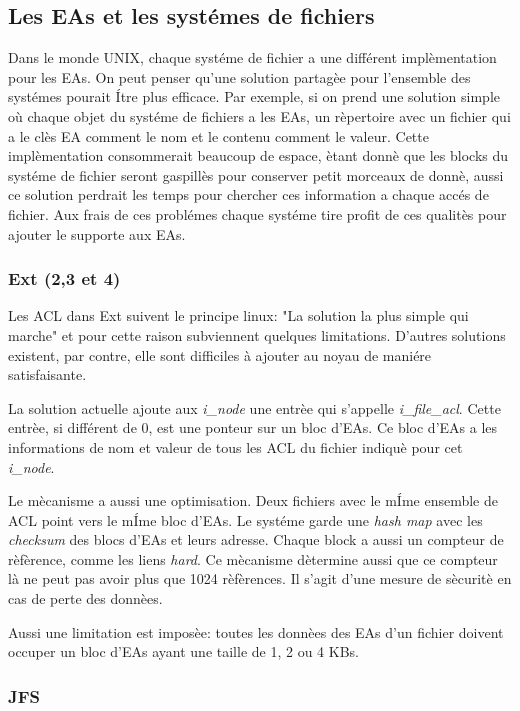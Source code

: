 \subsection{Les EAs et les systémes de fichiers}
 
Dans le monde UNIX, chaque systéme de fichier a une différent implèmentation pour les EAs. On peut penser qu'une solution partagèe pour l'ensemble des systémes pourait Ítre plus efficace. Par exemple, si on prend une solution simple où chaque objet du systéme de fichiers a les EAs, un rèpertoire avec un fichier qui a le clès EA comment le nom et le contenu comment le valeur. Cette implèmentation consommerait beaucoup de espace, ètant donnè que les blocks du systéme de fichier seront gaspillès pour conserver petit morceaux de donnè, aussi ce solution perdrait les temps pour chercher ces information a chaque accés de fichier. Aux frais de ces problémes chaque systéme tire profit de ces qualitès pour ajouter le supporte aux EAs.
 
\subsubsection*{Ext (2,3 et 4)}
 
Les ACL dans Ext suivent le principe linux: "La solution la plus simple qui marche" et pour cette raison subviennent quelques limitations. D'autres solutions existent, par contre, elle sont difficiles à ajouter au noyau de maniére satisfaisante\cite{ext_acl}.
 
La solution actuelle ajoute aux \emph{i\_node} une entrèe qui s'appelle \emph{i\_file\_acl}. Cette entrèe, si différent de 0, est une ponteur sur un bloc d'EAs. Ce bloc d'EAs a les informations de nom et valeur de tous les ACL du fichier indiquè pour cet \emph{i\_node}.
 
Le mècanisme a aussi une optimisation. Deux fichiers avec le mÍme ensemble de ACL point vers le mÍme bloc d'EAs. Le systéme garde une \emph{hash map} avec les \emph{checksum} des blocs d'EAs et leurs adresse. Chaque block a aussi un compteur de rèfèrence, comme les liens \emph{hard}. Ce mècanisme dètermine aussi que ce compteur là ne peut pas avoir plus que 1024 rèfèrences. Il s'agit d'une mesure de sècuritè en cas de perte des donnèes.
 
Aussi une limitation est imposèe: toutes les donnèes des EAs d'un fichier doivent occuper un bloc d'EAs ayant une taille de 1, 2 ou 4 KBs.
 
 
\subsubsection*{JFS}
 
